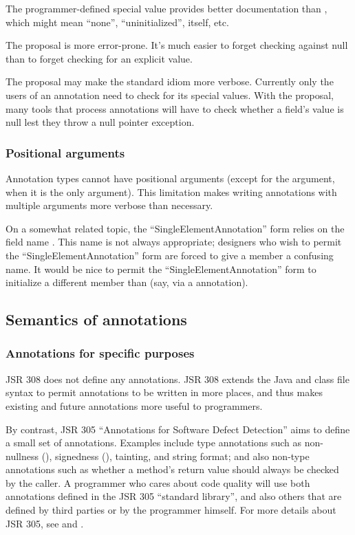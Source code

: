 \documentclass[10pt]{article}
\begin{document}
The programmer-defined special value provides better documentation than
, which might mean ``none'', ``uninitialized'', 
itself, etc.

The proposal is more error-prone.  It's much easier to forget checking
against null than to forget checking for an explicit value.

The proposal may make the standard idiom more verbose.  Currently only the
users of an annotation need to check for its special values.  With the
proposal, many tools that process annotations will have to check whether a
field's value is null lest they throw a null pointer exception.


\subsubsection{Positional arguments\label{positional-arguments}}

Annotation types cannot have positional arguments (except for the
 argument, when it is the only argument).  This limitation
makes writing annotations with multiple arguments more verbose than
necessary.

On a somewhat related topic, the ``SingleElementAnnotation'' form relies on
the field name .  This name is not always appropriate;
designers who wish to permit the ``SingleElementAnnotation'' form are
forced to give a member a confusing name.  It would be nice to permit the
``SingleElementAnnotation'' form to initialize a different member than
 (say, via a  annotation).


\subsection{Semantics of annotations\label{semantics}}

\subsubsection{Annotations for specific purposes\label{no-defined-annotations}}

JSR 308 does not define any annotations.
JSR 308 extends the Java and class file syntax to permit
annotations to be written in more places, and thus makes existing and
future annotations more useful to programmers.

By contrast, JSR 305 ``Annotations for Software Defect Detection'' aims to
define a small set of annotations.
Examples include type annotations such as non-nullness
(), signedness (), tainting, and string
format; and also non-type annotations such as whether a method's return
value should always be checked by the caller.
A programmer who cares about code quality will use both annotations
defined in the JSR 305 ``standard library'', and also others that are
defined by third parties or by the programmer himself.
For more details about JSR 305, see
 and
.
\end{document}
